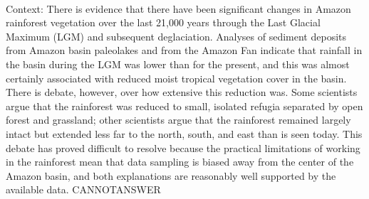 \documentclass[11pt,a4paper, onecolumn]{article}
\begin{document}
\\ Context: There is evidence that there have been significant changes in Amazon rainforest vegetation over the last 21,000 years through the Last Glacial Maximum (LGM) and subsequent deglaciation. Analyses of sediment deposits from Amazon basin paleolakes and from the Amazon Fan indicate that rainfall in the basin during the LGM was lower than for the present, and this was almost certainly associated with reduced moist tropical vegetation cover in the basin. There is debate, however, over how extensive this reduction was. Some scientists argue that the rainforest was reduced to small, isolated refugia separated by open forest and grassland; other scientists argue that the rainforest remained largely intact but extended less far to the north, south, and east than is seen today. This debate has proved difficult to resolve because the practical limitations of working in the rainforest mean that data sampling is biased away from the center of the Amazon basin, and both explanations are reasonably well supported by the available data. CANNOTANSWER
\end{document}
